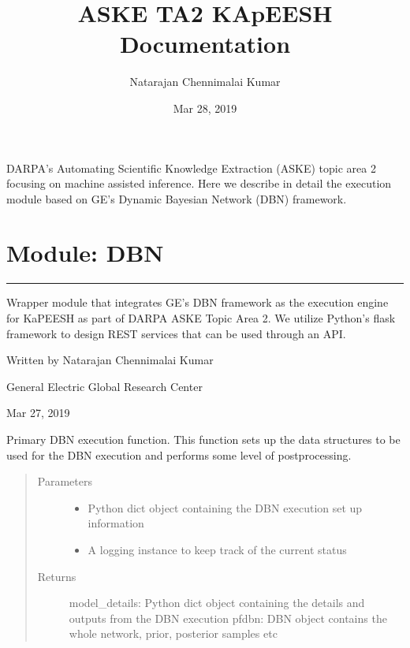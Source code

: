 \documentclass[letterpaper,10pt,english]{sphinxmanual}
\title{ASKE TA2 KApEESH Documentation}
\date{Mar 28, 2019}
\author{Natarajan Chennimalai Kumar}
\begin{document}
\maketitle
\sphinxtableofcontents
{}\label{\detokenize{index::doc}}


DARPA’s Automating Scientific Knowledge Extraction (ASKE) topic area 2 focusing on machine assisted inference. Here we describe in detail
the execution module based on GE’s Dynamic Bayesian Network (DBN) framework.


\chapter{Module: DBN}
\label{\detokenize{index:module-dbn}}\label{\detokenize{index:welcome-to-aske-ta2-kapeesh-s-documentation}}

\bigskip\hrule\bigskip

\label{\detokenize{index:module-dbnrisk_wrapper_aske}}
Wrapper module that integrates GE’s DBN framework as the execution engine for KaPEESH as part of DARPA ASKE Topic Area 2.
We utilize Python’s flask framework to design REST services that can be used through an API.

Written by Natarajan Chennimalai Kumar

General Electric Global Research Center

Mar 27, 2019

\begin{fulllineitems}
\label{\detokenize{index:dbnrisk_wrapper_aske.RunDBNExecute}}
Primary DBN execution function. This function sets up the data structures to be used for the DBN execution
and performs some level of postprocessing.
\begin{quote}\begin{description}
\item[{Parameters}] \leavevmode\begin{itemize}
\item {} 
 \textendash{} Python dict object containing the DBN execution set up information

\item {} 
 \textendash{} A logging instance to keep track of the current status

\end{itemize}

\item[{Returns}] \leavevmode
model\_details: Python dict object containing the details and outputs from the DBN execution
pfdbn: DBN object contains the whole network, prior, posterior samples etc

\end{description}\end{quote}

\end{fulllineitems}
\end{document}
